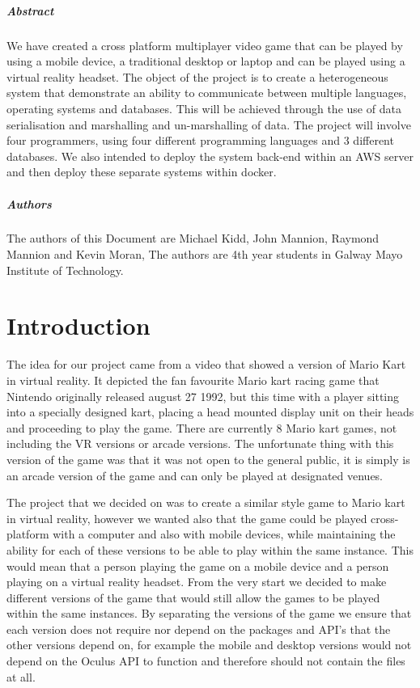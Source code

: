 
\newpage
\paragraph{Abstract}
We have created a cross platform multiplayer video game that can be played by using a mobile device, a traditional desktop or laptop and can be played using a virtual reality headset. The object of the project is to create a heterogeneous system that demonstrate an ability to communicate between multiple languages, operating systems and databases. This will be achieved through the use of data serialisation and marshalling and un-marshalling of data. The project will involve four programmers, using four different programming languages and 3 different databases. We also intended to deploy the system back-end within an AWS server and then deploy these separate systems within docker.

\paragraph{Authors}
The authors of this Document are Michael Kidd, John Mannion, Raymond Mannion and Kevin Moran, The authors are 4th year students in Galway Mayo Institute of Technology.

\chapter{Introduction}
The idea for our project came from a video that showed a version of Mario Kart in virtual reality. It depicted the fan favourite Mario kart racing game that Nintendo originally released august 27 1992, but this time with a player sitting into a specially designed kart, placing a head mounted display unit on their heads and proceeding to play the game. There are currently 8 Mario kart games, not including the VR versions or arcade versions. The unfortunate thing with this version of the game was that it was not open to the general public, it is simply is an arcade version of the game and can only be played at designated venues.\newline

The project that we decided on was to create a similar style game to Mario kart in virtual reality, however we wanted also that the game could be played cross-platform with a computer and also with mobile devices, while maintaining the ability for each of these versions to be able to play within the same instance. This would mean that a person playing the game on a mobile device and a person playing on a virtual reality headset. From the very start we decided to make different versions of the game that would still allow the games to be played within the same instances. By separating the versions of the game we ensure that each version does not require nor depend on the packages and API's that the other versions depend on, for example the mobile and desktop versions would not depend on the Oculus API to function and therefore should not contain the files at all. \newline

